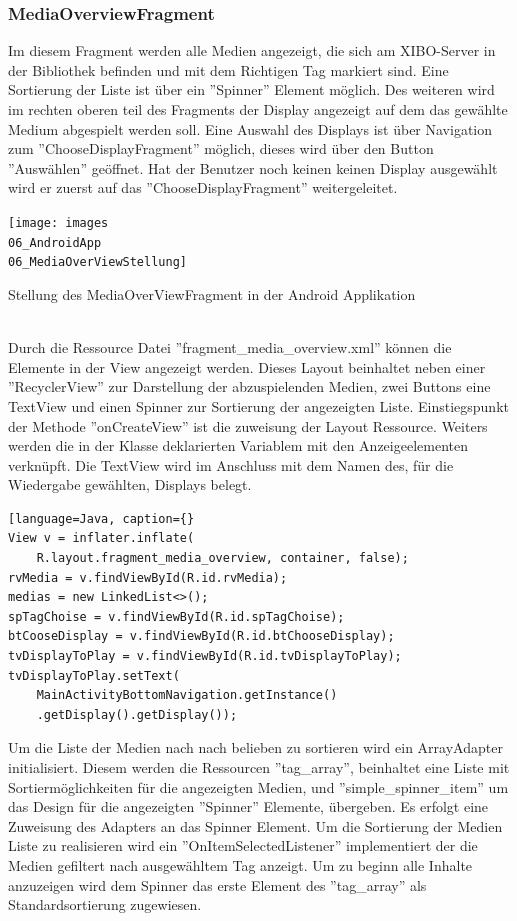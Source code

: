 \subsubsection{MediaOverviewFragment}
Im diesem Fragment werden alle Medien angezeigt, die sich am XIBO-Server in der Bibliothek befinden und mit dem Richtigen Tag markiert sind. Eine Sortierung der Liste ist über ein ''Spinner'' Element möglich. Des weiteren wird im rechten oberen teil des Fragments der Display angezeigt auf dem das gewählte Medium abgespielt werden soll. Eine Auswahl des Displays ist über Navigation zum ''ChooseDisplayFragment'' möglich, dieses wird über den Button ''Auswählen'' geöffnet. Hat der Benutzer noch keinen keinen Display ausgewählt wird er zuerst auf das ''ChooseDisplayFragment'' weitergeleitet.
\\
\begin{mediaNav}
\centering
\texttt{[image: images\\06\_AndroidApp\\06\_MediaOverViewStellung]}
\caption{Stellung des MediaOverViewFragment in der Android Applikation}
\label{fig:mediaNav}
\end{mediaNav}
\\
Durch die Ressource Datei ''fragment\_media\_overview.xml'' können die Elemente in der View angezeigt werden. Dieses Layout beinhaltet neben einer ''RecyclerView'' zur Darstellung der abzuspielenden Medien, zwei Buttons eine TextView und einen Spinner zur Sortierung der angezeigten Liste. Einstiegspunkt der Methode ''onCreateView'' ist die zuweisung der Layout Ressource. Weiters werden die in der Klasse deklarierten Variablem mit den Anzeigeelementen verknüpft. Die TextView wird im Anschluss mit dem Namen des, für die Wiedergabe gewählten, Displays belegt.
\begin{lstlisting}[language=Java, caption={}
View v = inflater.inflate(
	R.layout.fragment_media_overview, container, false);
rvMedia = v.findViewById(R.id.rvMedia);
medias = new LinkedList<>();
spTagChoise = v.findViewById(R.id.spTagChoise);
btCooseDisplay = v.findViewById(R.id.btChooseDisplay);
tvDisplayToPlay = v.findViewById(R.id.tvDisplayToPlay);
tvDisplayToPlay.setText(
	MainActivityBottomNavigation.getInstance()
	.getDisplay().getDisplay()); 
\end{lstlisting}
Um die Liste der Medien nach nach belieben zu sortieren wird ein ArrayAdapter initialisiert. Diesem werden die Ressourcen ''tag\_array'', beinhaltet eine Liste mit Sortiermöglichkeiten für die angezeigten Medien, und ''simple\_spinner\_item'' um das Design für die angezeigten ''Spinner'' Elemente, übergeben. Es erfolgt eine Zuweisung des Adapters an das Spinner Element. Um die Sortierung der Medien Liste zu realisieren wird ein ''OnItemSelectedListener'' implementiert der die Medien gefiltert nach ausgewähltem Tag anzeigt. Um zu beginn alle Inhalte anzuzeigen wird dem Spinner das erste Element des ''tag\_array'' als Standardsortierung zugewiesen.
